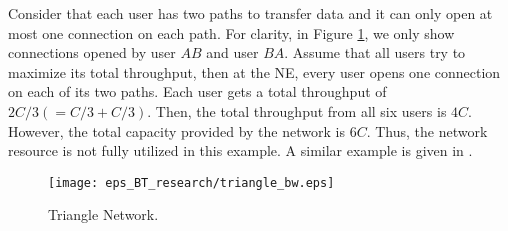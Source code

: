 \documentclass[conference]{IEEEtran}
\begin{document}
Consider that each user has two paths to transfer data and it can
only open at most one connection on each path. For clarity, in
Figure \ref{fig:triangle_bw}, we only show connections opened by
user $AB$ and user $BA$. Assume that all users try to maximize its
total throughput, then at the NE, every user opens one connection
on each of its two paths. Each user gets a total throughput of
$2C/3(=C/3+C/3)$. Then, the total throughput from all six users is
$4C$. However, the total capacity provided by the network is $6C$.
Thus, the network resource is not fully utilized in this example.
A similar example is given in \cite{key05fluid}.


\begin{figure}[htb!]
    \begin{center}
    \texttt{[image: eps\_BT\_research/triangle\_bw.eps]}
       \caption{Triangle Network.}
\label{fig:triangle_bw}
    \end{center}
\end{figure}







%
%
%


\end{document}
